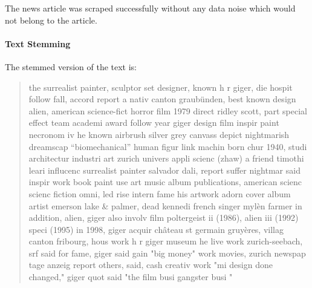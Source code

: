 The news article was scraped successfully without any data noise which would not belong to the article.

\paragraph{Text Stemming}
The stemmed version of the text is:
\begin{quote}
    the surrealist painter, sculptor set designer, known h r giger, die hospit follow fall,
    accord report a nativ canton graubünden, best known design alien,
    american science-fict horror film 1979 direct ridley scott,
    part special effect team academi award follow year giger design film inspir paint necronom
    iv he known airbrush silver grey canvass depict nightmarish dreamscap “biomechanical”
    human figur link machin born chur 1940, studi architectur industri art zurich univers appli scienc (zhaw)
    a friend timothi leari influcenc surrealist painter salvador dali, report suffer nightmar said
    inspir work book paint use art music album publications, american scienc scienc fiction omni,
    led rise intern fame his artwork adorn cover album artist emerson lake \& palmer, dead kennedi
    french singer mylèn farmer in addition, alien, giger also involv film poltergeist ii (1986),
    alien iii (1992) speci (1995) in 1998, giger acquir château st germain gruyères, villag canton fribourg,
    hous work h r giger museum he live work zurich-seebach, srf said for fame, giger said gain "big money"
    work movies, zurich newspap tage anzeig report others, said, cash creativ work "mi design done changed,"
    giger quot said "the film busi gangster busi "
\end{quote}


